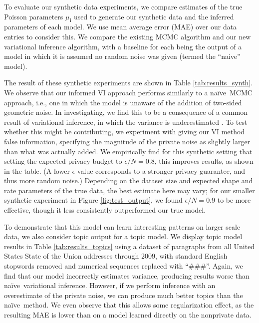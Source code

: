 \documentclass{article}
\newcommand{\subs}{\pmb{i}}
\newcommand{\mus}{\mu_{\subs}}
\newcommand{\naive}{na\"{i}ve}
\begin{document}
  To evaluate our synthetic data experiments, we compare estimates of the true
  Poisson parameters $\mus$ used to generate our synthetic data and the inferred
  parameters of each model. We use mean average error (MAE) over our data entries
  to consider this. We compare the existing MCMC algorithm and our new variational
  inference algorithm, with a baseline for each being the output of a model in which
  it is assumed no random noise was given (termed the ``naive'' model).
  
  The result of these synthetic experiments are shown in Table
  \ref{tab:results_synth}. We observe that our informed VI approach performs
  similarly to a \naive~MCMC approach, i.e., one in which the model is unaware of
  the addition of two-sided geometric noise. In investigating, we find this to
  be a consequence of a common result of variational inference, in which the
  variance is underestimated \cite{blei2017variational}. To test whether this
  might be contributing, we experiment with giving our VI method false
  information, specifying the magnitude of the private noise as slightly larger
  than what was actually added. We empirically find for this synthetic setting
  that setting the expected privacy budget to $\epsilon / N = 0.8$, this
  improves results, as shown in the table. (A lower $\epsilon$ value corresponds
  to a stronger privacy guarantee, and thus more random noise.) Depending on the
  dataset size and expected shape and rate parameters of the true data, the best
  estimate here may vary; for our smaller synthetic experiment in Figure
  \ref{fig:test_output}, we found $\epsilon / N = 0.9$ to be more effective,
  though it less consistently outperformed our true model.

  To demonstrate that this model can learn interesting patterns on larger scale
  data, we also consider topic output for a topic model. We display topic model
  results in Table \ref{tab:results_topics} using a dataset of paragraphs from
  all United States State of the Union addresses through 2009, with standard
  English stopwords removed and numerical sequences replaced with ``\#\#\#''.
  Again, we find that our model incorrectly estimates variance, producing
  results worse than \naive~variational inference. However, if we perform
  inference with an overestimate of the private noise, we can produce much
  better topics than the \naive~method. We even observe that this allows some
  regularization effect, as the resulting MAE is lower than on a model learned
  directly on the nonprivate data.
\end{document}
